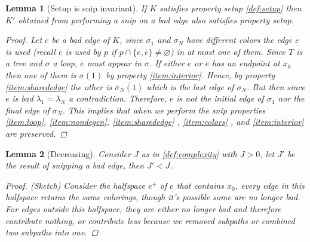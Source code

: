 \documentclass{article}
\theoremstyle{mystyle}
\newtheorem{lem}{Lemma}[section]
\theoremstyle{remark}
\begin{document}
\begin{lem}
    [Setup is snip invariant]
 \label{lem:preservesetup} 
    If \(K\) satisfies property setup \ref{def:setup}  then \(K'\) obtained from performing a snip on a bad edge also satisfies property setup.
    \begin{proof}
        Let \(e\) be a bad edge of \(K\), since \(\sigma_{1}\) and \(\sigma_{N}\) have different colors the edge \(e\) is used (recall \(e\) is used by \(p\) if \(p \cap \{e, \overline{e}\} \neq \varnothing \)) in at most one of them. Since \(T\) is a tree and \(\sigma\) a loop, \(\overline{e}\) must appear in \(\sigma\).
        If either \(e\) or \(\overline{e}\) has an endpoint at \(x_{0}\) then one of them is \(\sigma (1)\) by property \ref{item:interior}. Hence, by property \ref{item:sharededge} the other is \(\overline{\overline\sigma_{N} (1)}\) which is the last edge of \(\sigma_{N}\). But then since \(e\) is bad \(\lambda_{1} = \lambda_{N}\) a contradiction. Therefore, \(e\) is not the initial edge of \(\sigma_{1}\) nor the final edge of \(\sigma_{N}\). This implies that when we perform the snip properties \ref{item:loop}, \ref{item:nondegen}, \ref{item:sharededge} , \ref{item:colors} , and \ref{item:interior} are preserved. 
    \end{proof}
\end{lem}

\begin{lem}
    [Decreasing]
    \label{lem:decreasing} 
    Consider \(J\) as in \ref{def:complexity} with \(J > 0\), let \(J'\) be the result of snipping a bad edge, then \(J' < J\).
    \begin{proof}
        (Sketch)
        Consider the halfspace \(e^{+}\) of \(e\) that contains \(x_{0}\), every edge in this halfspace retains the same colorings, though it's possible some are no longer bad. For edges outside this halfspace, they are either no longer bad and therefore contribute nothing, or contribute less because we removed subpaths or combined two subpaths into one.
    \end{proof}
\end{lem}
\end{document}
